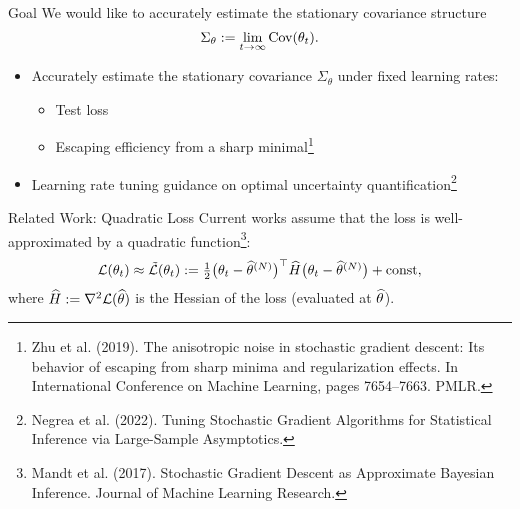 \documentclass[10pt,xcolor=table]{beamer}
\begin{document}
\begin{frame}{Goal}
We would like to accurately estimate the stationary covariance structure 
\begin{equation*}
\Sigma_{\theta} \defas \lim_{t \to \infty} \text{Cov} (\theta_{t}).
\end{equation*}

\begin{itemize}
	\item Accurately estimate the stationary covariance $\Sigma_{\theta}$ under fixed learning rates:
	\begin{itemize}
     \item Test loss
     \item Escaping efficiency from a sharp minimal\footnote{Zhu et al. (2019). The
     	anisotropic noise in stochastic gradient descent: Its behavior of escaping from sharp minima and regularization
     	effects. In International Conference on Machine Learning, pages 7654–7663. PMLR.}
     \end{itemize}
     \item Learning rate tuning guidance on optimal uncertainty quantification\footnote{Negrea et al. (2022). Tuning Stochastic Gradient Algorithms for Statistical Inference via Large-Sample Asymptotics.}
\end{itemize}
\end{frame}

\begin{frame}{Related Work: Quadratic Loss}
	Current works assume that the loss is well-approximated by a quadratic function\footnote{Mandt et al. (2017). Stochastic Gradient Descent as Approximate Bayesian Inference. Journal of Machine Learning Research.}:
	\begin{equation*}
		\textstyle\loss(\theta_{t}) \approx \tilde{\loss}(\theta_{t}) := \frac{1}{2} \rbra[\big]{\theta_{t}-\MLEN}^{\top} \hess \rbra[\big]{\theta_{t}-\MLEN} + \mathrm{const},
	\end{equation*}
	where $\hess \defas \grad^{2} \loss(\MLE)$ is the Hessian of the loss (evaluated at $\MLE$). 
\end{frame}
\end{document}
